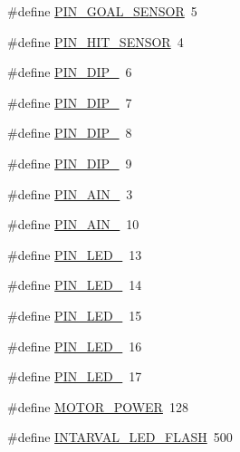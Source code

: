 \begin{DoxyCompactItemize}
\item 
\#define \mbox{\hyperlink{iraira__bo__up__down__mod_8ino_a04bd3af8e0d78c7fb2a066085fb8ed19}{P\+I\+N\+\_\+\+G\+O\+A\+L\+\_\+\+S\+E\+N\+S\+OR}}~5
\item 
\#define \mbox{\hyperlink{iraira__bo__up__down__mod_8ino_a4d3004c75c745c0b097de0dfea5e52de}{P\+I\+N\+\_\+\+H\+I\+T\+\_\+\+S\+E\+N\+S\+OR}}~4
\item 
\#define \mbox{\hyperlink{iraira__bo__up__down__mod_8ino_a1865ea46eaf057c61c9661e6777e617b}{P\+I\+N\+\_\+\+D\+I\+P\+\_}}~6
\item 
\#define \mbox{\hyperlink{iraira__bo__up__down__mod_8ino_aad6f8823636ffe5bee61d57219a18f53}{P\+I\+N\+\_\+\+D\+I\+P\+\_}}~7
\item 
\#define \mbox{\hyperlink{iraira__bo__up__down__mod_8ino_af0b38ba5f8b9c96b3a1f03b00382739c}{P\+I\+N\+\_\+\+D\+I\+P\+\_}}~8
\item 
\#define \mbox{\hyperlink{iraira__bo__up__down__mod_8ino_a2d393a9dffb71739bd6aa98a0eb94e76}{P\+I\+N\+\_\+\+D\+I\+P\+\_}}~9
\item 
\#define \mbox{\hyperlink{iraira__bo__up__down__mod_8ino_a54103bbaebaebd27b24906bbefd36e18}{P\+I\+N\+\_\+\+A\+I\+N\+\_}}~3
\item 
\#define \mbox{\hyperlink{iraira__bo__up__down__mod_8ino_adf28ad9e2dd0fdecf6d50a65b63bff39}{P\+I\+N\+\_\+\+A\+I\+N\+\_}}~10
\item 
\#define \mbox{\hyperlink{iraira__bo__up__down__mod_8ino_af1ab79f4742613cc2f7f472d9d6c6570}{P\+I\+N\+\_\+\+L\+E\+D\+\_}}~13
\item 
\#define \mbox{\hyperlink{iraira__bo__up__down__mod_8ino_a0856e6b89a9e5cb8a8bbbf6ba9f7dccc}{P\+I\+N\+\_\+\+L\+E\+D\+\_}}~14
\item 
\#define \mbox{\hyperlink{iraira__bo__up__down__mod_8ino_afac55df431f2832acd5b0afa6f56cbc1}{P\+I\+N\+\_\+\+L\+E\+D\+\_}}~15
\item 
\#define \mbox{\hyperlink{iraira__bo__up__down__mod_8ino_a1fffd93d20b6fe777713bd58125e3e0b}{P\+I\+N\+\_\+\+L\+E\+D\+\_}}~16
\item 
\#define \mbox{\hyperlink{iraira__bo__up__down__mod_8ino_a6581c9faeb95d91f151a7fda5ff9d963}{P\+I\+N\+\_\+\+L\+E\+D\+\_}}~17
\item 
\#define \mbox{\hyperlink{iraira__bo__up__down__mod_8ino_aac54a414e7b061922e16432c9437e6b8}{M\+O\+T\+O\+R\+\_\+\+P\+O\+W\+ER}}~128
\item 
\#define \mbox{\hyperlink{iraira__bo__up__down__mod_8ino_a6e499958b5cdf86ac62e20b22bbb4bcc}{I\+N\+T\+A\+R\+V\+A\+L\+\_\+\+L\+E\+D\+\_\+\+F\+L\+A\+SH}}~500
\end{DoxyCompactItemize}
